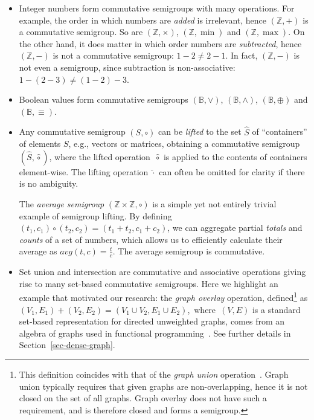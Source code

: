 \begin{itemize}
  \item Integer numbers form commutative semigroups with many operations. For
  example, the order in which numbers are \emph{added} is irrelevant, hence
  $(\mathbb{Z}, +)$ is a commutative semigroup. So are $(\mathbb{Z}, \times)$,
  $(\mathbb{Z}, \min)$ and $(\mathbb{Z}, \max)$. On the other hand, it does
  matter in which order numbers are \emph{subtracted}, hence $(\mathbb{Z}, -)$
  is not a commutative semigroup: $1-2 \neq 2-1$. In fact, $(\mathbb{Z}, -)$
  is not even a semigroup, since subtraction is non-associative:
  $1-(2-3) \neq (1-2)-3$.

  \item Boolean values form commutative semigroups $(\mathbb{B}, \vee)$,
  $(\mathbb{B}, \wedge)$, $(\mathbb{B}, \oplus)$ and $(\mathbb{B}, \equiv)$.

  \item Any commutative semigroup $(S, \circ)$ can be \emph{lifted} to the set
  $\hat{S}$ of ``containers'' of elements $S$, e.g., vectors or matrices,
  obtaining a commutative semigroup $(\hat{S}, \hat{\circ})$, where the lifted
  operation~$\hat{\circ}$ is applied to the contents of containers element-wise.
  The lifting operation $\hat{\cdot}$ can often be omitted for clarity if there
  is no ambiguity.

  The \emph{average semigroup} $(\mathbb{Z} \times \mathbb{Z}, \circ)$ is a
  simple yet not entirely trivial example of semigroup lifting. By defining
  $(t_1, c_1) \circ (t_2, c_2) = (t_1 + t_2, c_1 + c_2)$, we can aggregate
  partial \emph{totals} and \emph{counts} of a set of numbers, which allows us
  to efficiently calculate their average as $\textit{avg}(t, c) = \frac{t}{c}$.
  The average semigroup is commutative.

  \item Set union and intersection are commutative and associative operations
  giving rise to many set-based commutative semigroups. Here we highlight an
  example that motivated our research: the \emph{graph overlay} operation,
  defined\footnote{This definition coincides with that of the
  \emph{graph union} operation~\cite{1969_graph_theory_harary}. Graph union
  typically requires that given graphs are non-overlapping, hence it is not
  closed on the set of all graphs. Graph overlay does not have such a
  requirement, and is therefore closed and forms a semigroup.} as
  $(V_1, E_1) + (V_2, E_2) = (V_1 \cup V_2, E_1 \cup E_2)$,~where~$(V, E)$ is
  a standard set-based representation for directed unweighted graphs, comes from
  an algebra of graphs used in functional programming~\cite{mokhov2017algebraic}.
  See further details in Section~\ref{sec-dense-graph}.
\end{itemize}

